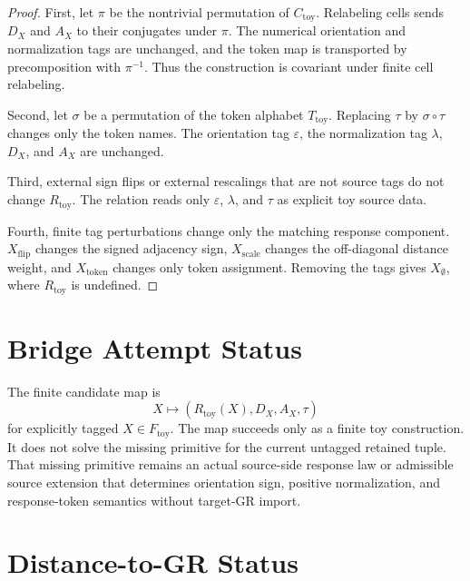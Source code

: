 \documentclass[11pt]{article}
\begin{document}
\begin{proof}
First, let \(\pi\) be the nontrivial permutation of
\(C_{\mathrm{toy}}\). Relabeling cells sends \(D_X\) and \(A_X\) to
their conjugates under \(\pi\). The numerical orientation and
normalization tags are unchanged, and the token map is transported by
precomposition with \(\pi^{-1}\). Thus the construction is covariant
under finite cell relabeling.

Second, let \(\sigma\) be a permutation of the token alphabet
\(T_{\mathrm{toy}}\). Replacing \(\tau\) by \(\sigma\circ\tau\)
changes only the token names. The orientation tag \(\varepsilon\), the
normalization tag \(\lambda\), \(D_X\), and \(A_X\) are unchanged.

Third, external sign flips or external rescalings that are not source
tags do not change \(R_{\mathrm{toy}}\). The relation reads only
\(\varepsilon\), \(\lambda\), and \(\tau\) as explicit toy source data.

Fourth, finite tag perturbations change only the matching response
component. \(X_{\mathrm{flip}}\) changes the signed adjacency sign,
\(X_{\mathrm{scale}}\) changes the off-diagonal distance weight, and
\(X_{\mathrm{token}}\) changes only token assignment. Removing the tags
gives \(X_{\emptyset}\), where \(R_{\mathrm{toy}}\) is undefined.
\end{proof}

\section{Bridge Attempt Status}

The finite candidate map is
\[
  X\longmapsto (R_{\mathrm{toy}}(X),D_X,A_X,\tau)
\]
for explicitly tagged \(X\in F_{\mathrm{toy}}\). The map succeeds only
as a finite toy construction. It does not solve the missing primitive
for the current untagged retained tuple. That missing primitive remains
an actual source-side response law or admissible source extension that
determines orientation sign, positive normalization, and response-token
semantics without target-GR import.

\section{Distance-to-GR Status}
\end{document}
